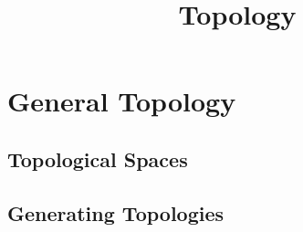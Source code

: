 

\title{Topology}


\maketitle
\tableofcontents
\listoftodos

\part{General Topology}

\chapter{Topological Spaces}







\chapter{Generating Topologies}






